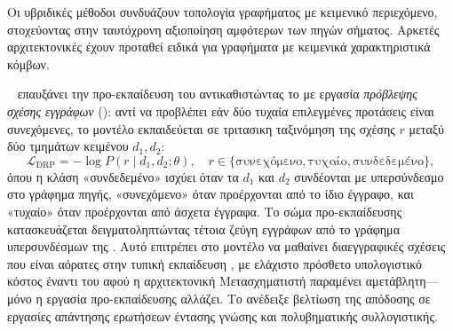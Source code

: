 Οι υβριδικές μέθοδοι συνδυάζουν τοπολογία γραφήματος με κειμενικό περιεχόμενο, στοχεύοντας
στην ταυτόχρονη αξιοποίηση αμφότερων των πηγών σήματος.
Αρκετές αρχιτεκτονικές έχουν
προταθεί ειδικά για γραφήματα με κειμενικά χαρακτηριστικά κόμβων.

\textbf{}~\cite{yasunaga2022linkbert} επαυξάνει την προ-εκπαίδευση του 
αντικαθιστώντας το  με εργασία \textit{πρόβλεψης σχέσης εγγράφων} (): αντί να
προβλέπει εάν δύο τυχαία επιλεγμένες προτάσεις είναι συνεχόμενες, το μοντέλο
εκπαιδεύεται σε τριτασικη ταξινόμηση της σχέσης $r$ μεταξύ δύο τμημάτων κειμένου
$d_1, d_2$:
\begin{equation}
    \mathcal{L}_{\mathrm{DRP}} = -\log P(r \mid d_1, d_2; \theta), \quad
    r \in \{\text{συνεχόμενο}, \text{τυχαίο}, \text{συνδεδεμένο}\},
    \label{eq:linkbert-drp}
\end{equation}
όπου η κλάση «συνδεδεμένο» ισχύει όταν τα $d_1$ και $d_2$ συνδέονται με
υπερσύνδεσμο στο γράφημα πηγής, «συνεχόμενο» όταν προέρχονται από το ίδιο έγγραφο,
και «τυχαίο» όταν προέρχονται από άσχετα έγγραφα.
Το σώμα
προ-εκπαίδευσης κατασκευάζεται δειγματοληπτώντας τέτοια ζεύγη εγγράφων από το γράφημα
υπερσυνδέσμων της .
Αυτό επιτρέπει στο μοντέλο να μαθαίνει
διαεγγραφικές σχέσεις που είναι αόρατες στην τυπική εκπαίδευση , με ελάχιστο
πρόσθετο υπολογιστικό κόστος έναντι του  αφού η αρχιτεκτονική Μετασχηματιστή
παραμένει αμετάβλητη---μόνο η εργασία προ-εκπαίδευσης αλλάζει.
Το 
ανέδειξε βελτίωση της απόδοσης σε εργασίες απάντησης ερωτήσεων έντασης γνώσης και
πολυβηματικής συλλογιστικής.

